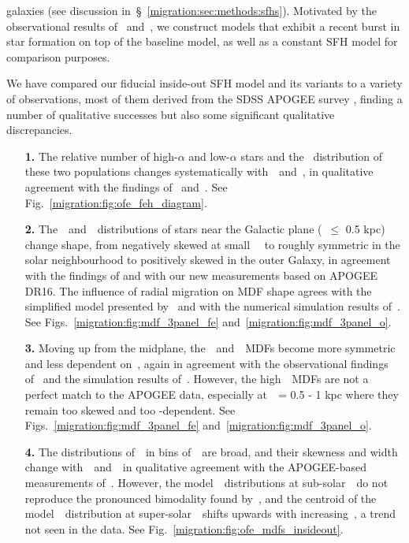 galaxies (see discussion in~\S~\ref{migration:sec:methods:sfhs}). 
Motivated by the observational results of~\citet{Mor2019} and~\citet{Isern2019}, 
we construct models that exhibit a recent burst in star formation on top of the 
baseline model, as well as a constant SFH model for comparison purposes. 
\par 
We have compared our fiducial inside-out SFH model and its variants to a 
variety of observations, most of them derived from the SDSS APOGEE survey 
\citep{Majewski2017}, finding a number of qualitative successes but also some 
significant qualitative discrepancies. 
\begin{enumerate} 

	\item[\textbf{1.}] The relative number of high-$\alpha$ and low-$\alpha$ 
	stars and the \feh~distribution of these two populations changes 
	systematically with~\rgal~and~\absz, in qualitative agreement with the 
	findings of~\citet{Nidever2014} and~\citet{Hayden2015}. 
	See Fig.~\ref{migration:fig:ofe_feh_diagram}. 

	\item[\textbf{2.}] The~\feh~and~\oh~distributions of stars near the 
	Galactic plane (\absz~$\leq$ 0.5 kpc) change shape, from negatively skewed 
	at small~\rgal~ to roughly symmetric in the solar neighbourhood to 
	positively skewed in the outer Galaxy, in agreement with the findings of 
	\citet{Hayden2015} and with our new measurements based on APOGEE DR16. 
	The influence of radial migration on MDF shape agrees with the simplified 
	model presented by~\citet{Hayden2015} and with the numerical simulation 
	results of~\citet{Loebman2016}. 
	See Figs.~\ref{migration:fig:mdf_3panel_fe} and~\ref{migration:fig:mdf_3panel_o}. 

	\item[\textbf{3.}] Moving up from the midplane, the~\feh~and~\oh~MDFs 
	become more symmetric and less dependent on~\rgal, again in agreement with 
	the observational findings of~\citet{Hayden2015} and the simulation results 
	of~\citet{Loebman2016}. 
	However, the high~\absz~MDFs are not a perfect match to the APOGEE data, 
	especially at~\absz~= 0.5 - 1 kpc where they remain too skewed and too
	\rgal-dependent. 
	See Figs.~\ref{migration:fig:mdf_3panel_fe} and~\ref{migration:fig:mdf_3panel_o}. 

	\item[\textbf{4.}] The distributions of~\ofe~in bins of~\feh~are broad, and 
	their skewness and width change with~\rgal~and~\absz~in qualitative 
	agreement with the APOGEE-based measurements of~\citet{Vincenzo2021a}. 
	However, the model~\ofe~distributions at sub-solar~\feh~do not reproduce 
	the pronounced bimodality found by~\citet{Vincenzo2021a}, and the 
	centroid of the model~\ofe~distribution at super-solar~\feh~shifts upwards 
	with increasing~\absz, a trend not seen in the data. 
	See Fig.~\ref{migration:fig:ofe_mdfs_insideout}. 


\end{enumerate}
